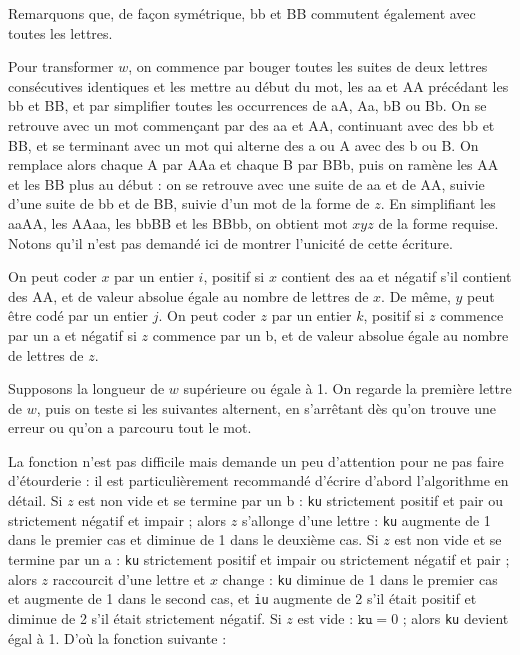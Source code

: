 Remarquons que, de façon symétrique, bb et BB commutent également avec toutes les lettres.

\Q
Pour transformer $w$, on commence par bouger toutes les suites de deux lettres consécutives identiques et les mettre au début du mot, les aa et AA précédant les bb et BB, et par simplifier toutes les occurrences de aA, Aa, bB ou Bb. On se retrouve avec un mot commençant par des aa et AA, continuant avec des bb et BB, et se terminant avec un mot qui alterne des a ou A avec des b ou B. On remplace alors chaque A par AAa et chaque B par BBb, puis on ramène les AA et les BB plus au début : on se retrouve avec une suite de aa et de AA, suivie d'une suite de bb et de BB, suivie d'un mot de la forme de $z$. En simplifiant les aaAA, les AAaa, les bbBB et les BBbb, on obtient mot $xyz$ de la forme requise. Notons qu'il n'est pas demandé ici de montrer l'unicité de cette écriture.

\Q
On peut coder $x$ par un entier $i$, positif si $x$ contient des aa et négatif s'il contient des AA, et de valeur absolue égale au nombre de lettres de $x$. De même, $y$ peut être codé par un entier $j$. On peut coder $z$ par un entier $k$, positif si $z$ commence par un a et négatif si $z$ commence par un b, et de valeur absolue égale au nombre de lettres de $z$.

\Q
Supposons la longueur de $w$ supérieure ou égale à 1. On regarde la première lettre de $w$, puis on teste si les suivantes alternent, en s'arrêtant dès qu'on trouve une erreur ou qu'on a parcouru tout le mot.



\Q
La fonction n'est pas difficile mais demande un peu d'attention pour ne pas faire d'étourderie : il est particulièrement recommandé d'écrire d'abord l'algorithme en détail. Si $z$ est non vide et se termine par un b : \texttt{ku} strictement positif et pair ou strictement négatif et impair ; alors $z$ s'allonge d'une lettre : \texttt{ku} augmente de 1 dans le premier cas et diminue de 1 dans le deuxième cas. Si $z$ est non vide et se termine par un a : \texttt{ku} strictement positif et impair ou strictement négatif et pair ; alors $z$ raccourcit d'une lettre et $x$ change : \texttt{ku} diminue de 1 dans le premier cas et augmente de 1 dans le second cas, et \texttt{iu} augmente de 2 s'il était positif et diminue de 2 s'il était strictement négatif. Si $z$ est vide : $\texttt{ku}=0$ ; alors \texttt{ku} devient égal à 1. D'où la fonction suivante :

